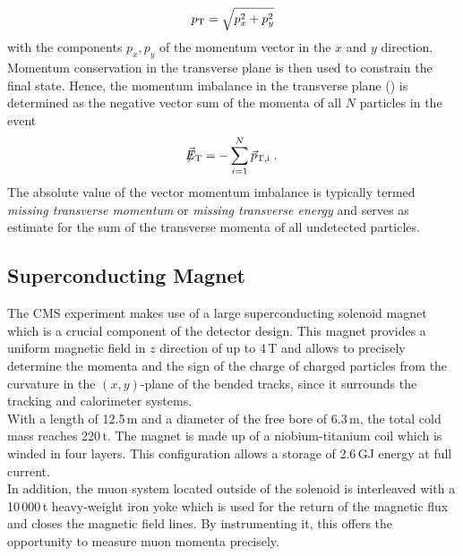 \begin{equation}
p_{\text{T}} = \sqrt{p_x^2 + p_y^2} 
\end{equation}
with the components $p_x, p_y$ of the momentum vector in the $x$ and $y$ direction. Momentum conservation in the transverse plane is then used to constrain the final state. Hence, the momentum imbalance in the transverse plane (\metvec) is determined as the negative vector sum of the momenta of all $N$ particles in the event
\begin{equation}
\slash\mkern-12mu{\vec{E}}_{\text{T}} = - \sum_{i=1}^{N} \vec{p}_\mathrm{T,i} \; .
\end{equation}
The absolute value of the vector momentum imbalance \met is typically termed \textit{missing transverse momentum} or \textit{missing transverse energy} and serves as estimate for the sum of the transverse momenta of all undetected particles.

\subsection{Superconducting Magnet}
\label{subsec:cms_magnet}
The CMS experiment makes use of a large superconducting solenoid magnet which is a crucial component of the detector design. This magnet provides a uniform magnetic field in $z$ direction of up to 4\,T and allows to precisely determine the momenta and the sign of the charge of charged particles from the curvature in the $(x, y)$-plane of the bended tracks, since it surrounds the tracking and calorimeter systems.\\
With a length of 12.5\,m and a diameter of the free bore of 6.3\,m, the total cold mass reaches 220\,t. The magnet is made up of a niobium-titanium coil which is winded in four layers. This configuration allows a storage of 2.6\,GJ energy at full current. \\
In addition, the muon system located outside of the solenoid is interleaved with a 10\,000\,t heavy-weight iron yoke which is used for the return of the magnetic flux and closes the magnetic field lines. By instrumenting it, this offers the opportunity to measure muon momenta precisely.  

